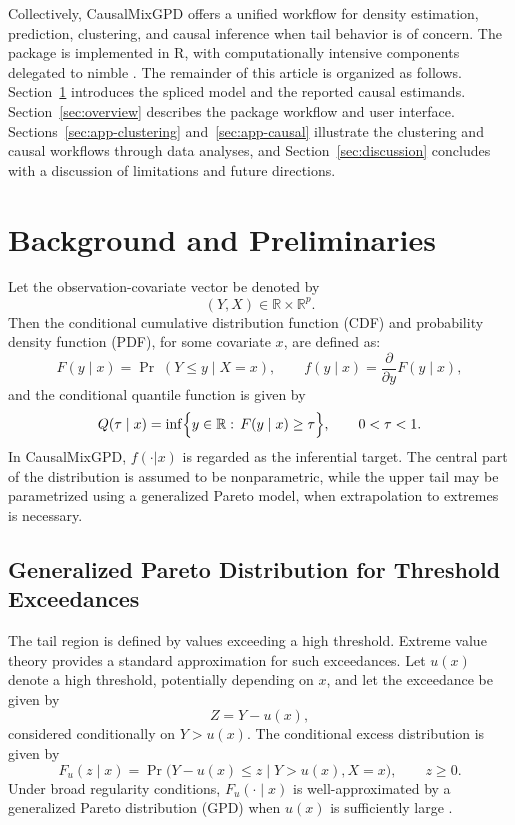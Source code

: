 \documentclass[article]{jss}\usepackage[]{graphicx}\usepackage[]{xcolor}
\DeclareRobustCommand{\pkg}[1]{\textsf{#1}}
\begin{document}
Collectively, \pkg{CausalMixGPD} offers a unified workflow for
density estimation, prediction, clustering, and causal inference when
tail behavior is of concern.  The package is implemented in
\textsf{R}, with computationally intensive components delegated to
\pkg{nimble} \citep{nimble_pkg}.  The remainder of this article is
organized as follows.  Section~\ref{sec:prelim} introduces the spliced
model and the reported causal estimands.
Section~\ref{sec:overview} describes the package workflow and user
interface.  Sections~\ref{sec:app-clustering}
and~\ref{sec:app-causal} illustrate the clustering and causal
workflows through data analyses, and Section~\ref{sec:discussion}
concludes with a discussion of limitations and future directions.

\section{Background and Preliminaries}
\label{sec:prelim}

Let the observation-covariate vector be denoted by
\begin{equation}
(Y,X) \in \mathbb{R}\times \mathbb{R}^p.
\end{equation}
Then the conditional cumulative distribution function (CDF) and probability density function (PDF), for some covariate $x$, are defined as:
\begin{equation}
F(y\mid x)=\Pr\;(Y\le y\mid X=x),
\qquad
f(y\mid x)=\frac{\partial}{\partial y}F(y\mid x),
\end{equation}
and the conditional quantile function is given by
\begin{equation}
Q(\tau\mid x)=\inf\Bigl\{y\in\mathbb{R}:\,F(y\mid x)\ge \tau\Bigr\},
\qquad 0<\tau<1.
\end{equation}
In \pkg{CausalMixGPD}, $f(\cdot|x)$ is regarded as the inferential target.
The central part of the distribution is assumed to be nonparametric, while
the upper tail may be parametrized using a generalized Pareto model, when
extrapolation to extremes is necessary.


\subsection{Generalized Pareto Distribution for Threshold Exceedances}
\label{subsec:gpd}

The tail region is defined by values exceeding a high threshold.
Extreme value theory provides a standard approximation for such
exceedances.  Let $u(x)$ denote a high threshold, potentially
depending on $x$, and let the exceedance be given by
\begin{equation}
Z = Y - u(x),
\end{equation}
considered conditionally on $Y > u(x)$.  The conditional excess
distribution is given by
\begin{equation}
F_u(z\mid x) = \Pr\!\bigl(Y-u(x) \le z \mid Y>u(x), X=x\bigr),
\qquad z \ge 0.
\label{eq:cedf}
\end{equation}
Under broad regularity conditions, $F_u(\cdot\mid x)$ is
well-approximated by a generalized Pareto distribution (GPD) when
$u(x)$ is sufficiently large
\citep{BalkemaDeHaan1974,Pickands1975,Coles2001}.
\end{document}
